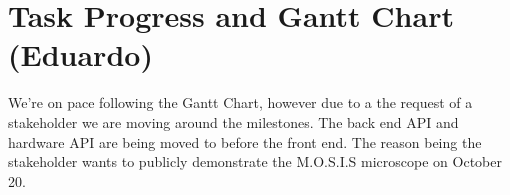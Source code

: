 \section{Task Progress and Gantt Chart (Eduardo)}
We're on pace following the Gantt Chart, however due to a the request of a stakeholder we are moving around the milestones. The back end API and hardware API are being moved to before the front end. The reason being the stakeholder wants to publicly demonstrate the M.O.S.I.S microscope on October 20.